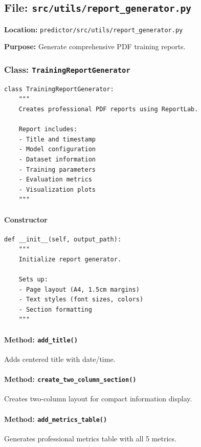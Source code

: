 \documentclass[11pt,a4paper]{article}
\begin{document}
\subsection{File: \texttt{src/utils/report\_generator.py}}

\textbf{Location:} \texttt{predictor/src/utils/report\_generator.py}

\textbf{Purpose:} Generate comprehensive PDF training reports.

\subsubsection{Class: \texttt{TrainingReportGenerator}}

\begin{lstlisting}
class TrainingReportGenerator:
    """
    Creates professional PDF reports using ReportLab.

    Report includes:
    - Title and timestamp
    - Model configuration
    - Dataset information
    - Training parameters
    - Evaluation metrics
    - Visualization plots
    """
\end{lstlisting}

\paragraph{Constructor}
\begin{lstlisting}
def __init__(self, output_path):
    """
    Initialize report generator.

    Sets up:
    - Page layout (A4, 1.5cm margins)
    - Text styles (font sizes, colors)
    - Section formatting
    """
\end{lstlisting}

\paragraph{Method: \texttt{add\_title()}}
Adds centered title with date/time.

\paragraph{Method: \texttt{create\_two\_column\_section()}}
Creates two-column layout for compact information display.

\paragraph{Method: \texttt{add\_metrics\_table()}}
Generates professional metrics table with all 5 metrics.
\end{document}
